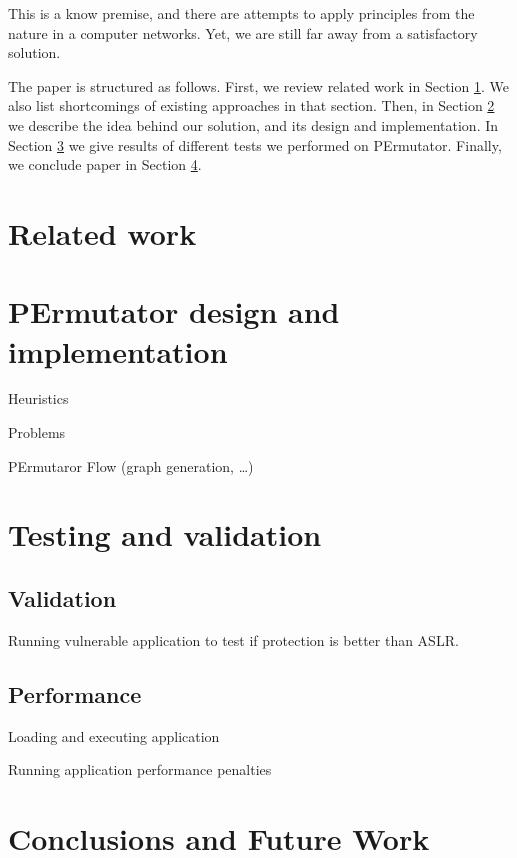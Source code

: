 \documentclass[11pt,final,conference,a4paper]{IEEEtran}
\begin{document}
This is a know premise, and there are attempts to apply principles
from the nature in a computer networks. Yet, we are still far away
from a satisfactory solution.

The paper is structured as follows. First, we review related work
in Section \ref{sec:architecture}. We also list shortcomings of
existing approaches in that section. Then, in Section \ref{sec:design}
we describe the idea behind our solution, and its design and
implementation. In Section \ref{sec:testing} we give results of
different tests we performed on PErmutator. Finally, we conclude
paper in Section \ref{sec:conclusions}.

\section{Related work}
\label{sec:architecture}

\section{PErmutator design and implementation}
\label{sec:design}

Heuristics

Problems

PErmutaror Flow (graph generation, \ldots)

\section{Testing and validation}
\label{sec:testing}

\subsection{Validation}

Running vulnerable application to test if protection is better than ASLR.

\subsection{Performance}

Loading and executing application

Running application performance penalties

\section{Conclusions and Future Work}
\label{sec:conclusions}




\nocite{arscryptolocker}
\end{document}

